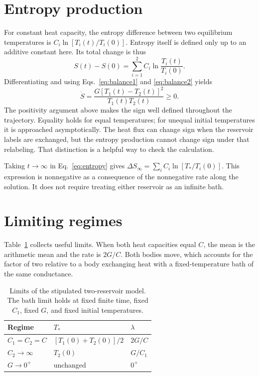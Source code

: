 \documentclass[aps,prx,reprint,groupedaddress]{revtex4-2}
\begin{document}
\section{Entropy production}
For constant heat capacity, the entropy difference between two equilibrium temperatures is $C_i\ln[T_i(t)/T_i(0)]$. Entropy itself is defined only up to an additive constant here. Its total change is thus
\begin{equation}
 S(t)-S(0)=\sum_{i=1}^{2} C_i\ln\frac{T_i(t)}{T_i(0)}.\label{eq:entropy}
\end{equation}
Differentiating and using Eqs.~\eqref{eq:balance1} and \eqref{eq:balance2} yields
\begin{equation}
 \dot S=\frac{G[T_1(t)-T_2(t)]^2}{T_1(t)T_2(t)}\geq0.\label{eq:srate}
\end{equation}
The positivity argument above makes the sign well defined throughout the trajectory. Equality holds for equal temperatures; for unequal initial temperatures it is approached asymptotically. The heat flux can change sign when the reservoir labels are exchanged, but the entropy production cannot change sign under that relabeling. That distinction is a helpful way to check the calculation.

Taking $t\to\infty$ in Eq.~\eqref{eq:entropy} gives $\Delta S_\infty=\sum_i C_i\ln[T_*/T_i(0)]$. This expression is nonnegative as a consequence of the nonnegative rate along the solution. It does not require treating either reservoir as an infinite bath.

\section{Limiting regimes}
Table~\ref{tab:limits} collects useful limits. When both heat capacities equal $C$, the mean is the arithmetic mean and the rate is $2G/C$. Both bodies move, which accounts for the factor of two relative to a body exchanging heat with a fixed-temperature bath of the same conductance.

\begin{table}[b]
\caption{Limits of the stipulated two-reservoir model. The bath limit holds at fixed finite time, fixed $C_1$, fixed $G$, and fixed initial temperatures.}\label{tab:limits}
\begin{ruledtabular}
\begin{tabular}{lll}
Regime & $T_*$ & $\lambda$ \\
\hline
$C_1=C_2=C$ & $[T_1(0)+T_2(0)]/2$ & $2G/C$ \\
$C_2\to\infty$ & $T_2(0)$ & $G/C_1$ \\
$G\to0^+$ & unchanged & $0^+$
\end{tabular}
\end{ruledtabular}
\end{table}
\end{document}
